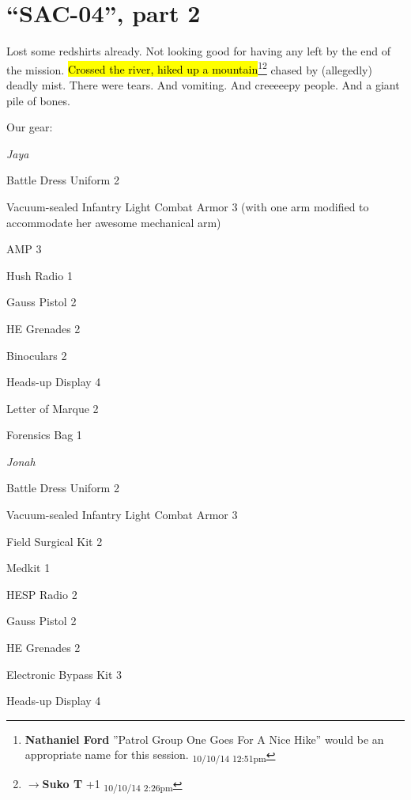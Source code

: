 \setcounter{chapter}{ 33 }
\chapter{\textbf{``SAC-04'', part 2} }





Lost some redshirts already.  Not looking good for having any left by the end of the mission. \hl{Crossed the river, hiked up a mountain}\footnote{\textbf{Nathaniel Ford }''Patrol Group One Goes For A Nice Hike'' would be an appropriate name for this session. \textsubscript{10/10/14 12:51pm}}\footnote{$\rightarrow$\textbf{Suko T }+1 \textsubscript{10/10/14 2:26pm}} chased by (allegedly) deadly mist.  There were tears.  And vomiting.  And creeeeepy people.  And a giant pile of bones. 



\noindent\hrulefill





Our gear:



\textit{Jaya}

Battle Dress Uniform 2

Vacuum-sealed Infantry Light Combat Armor 3 (with one arm modified to accommodate her awesome mechanical arm)

AMP 3

Hush Radio 1

Gauss Pistol 2

HE Grenades 2

Binoculars 2

Heads-up Display 4

Letter of Marque 2

Forensics Bag 1



\textit{Jonah}

Battle Dress Uniform 2

Vacuum-sealed Infantry Light Combat Armor 3

Field Surgical Kit 2

Medkit 1

HESP Radio 2

Gauss Pistol 2

HE Grenades 2

Electronic Bypass Kit 3

Heads-up Display 4

